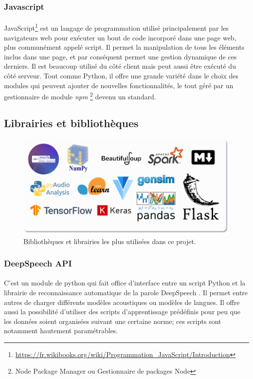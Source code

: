 		\subsubsection*{Javascript} 
		\paragraph{}
		JavaScript\footnote{\url{https://fr.wikibooks.org/wiki/Programmation_JavaScript/Introduction}} est un langage de programmation utilisé principalement par les navigateurs web pour exécuter un bout de code incorporé dans une page web, plus communément appelé script. Il permet la manipulation de tous les éléments inclus dans une page, et par conséquent permet une gestion dynamique de ces derniers. Il est beaucoup utilisé du côté client mais peut aussi être exécuté du côté serveur. Tout comme Python, il offre une grande variété dans le choix des modules qui peuvent ajouter de nouvelles fonctionnalités, le tout géré par un gestionnaire de module \textit{npm} \footnote{Node Package Manager ou Gestionnaire de packages Node} devenu un standard.
	
	\subsection{Librairies et bibliothèques}
	\begin{figure}[H] 
		\centering
		\includegraphics[width=0.9\linewidth]{images/implementation/libs_frams.png}
		\caption{Bibliothèques et librairies les plus utilisées dans ce projet.}
		\label{fig:libs_frams}
	\end{figure}
		\subsubsection*{DeepSpeech API}
		\paragraph{}
		C'est un module de python qui fait office d'interface entre un script Python et la librairie de reconnaissance automatique de la parole DeepSpeech \citep{deepspeech_paper}. Il permet entre autres de charger différents modèles acoustiques ou modèles de langues. Il offre aussi la possibilité d'utiliser des scripts d'apprentissage prédéfinis pour peu que les données soient organisées suivant une certaine norme; ces scripts sont notamment hautement paramétrables.

